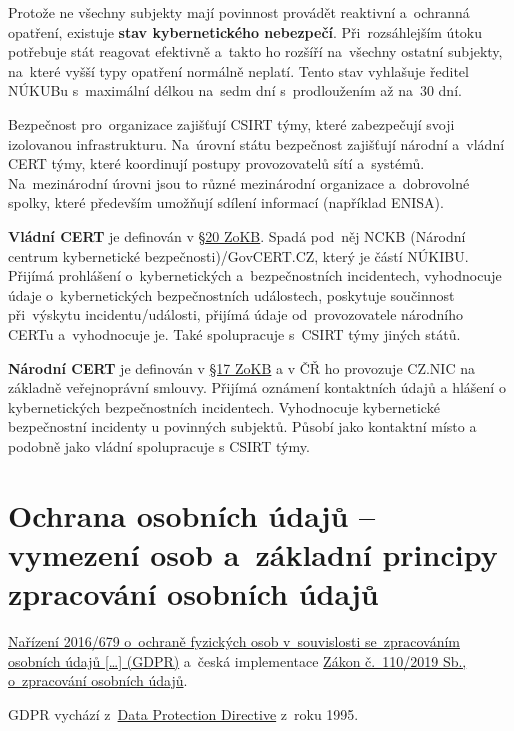Protože ne všechny subjekty mají povinnost provádět reaktivní a~ochranná opatření, existuje \textbf{stav kybernetického nebezpečí}. Při~rozsáhlejším útoku potřebuje stát reagovat efektivně a~takto ho rozšíří na~všechny ostatní subjekty, na~které vyšší typy opatření normálně neplatí. Tento stav vyhlašuje ředitel NÚKUBu s~maximální délkou na~sedm dní s~prodloužením až na~30 dní.

Bezpečnost pro~organizace zajišťují CSIRT týmy, které zabezpečují svoji izolovanou infrastrukturu. Na~úrovní státu bezpečnost zajišťují národní a~vládní CERT týmy, které koordinují postupy provozovatelů sítí a~systémů. Na~mezinárodní úrovni jsou to různé mezinárodní organizace a~dobrovolné spolky, které především umožňují sdílení informací (například ENISA).

\textbf{Vládní CERT} je definován v \href{https://www.zakonyprolidi.cz/cs/2014-181#p20}{§20 ZoKB}. Spadá pod~něj NCKB (Národní centrum kybernetické bezpečnosti)/GovCERT.CZ, který je částí NÚKIBU. Přijímá prohlášení o~kybernetických a~bezpečnostních incidentech, vyhodnocuje údaje o~kybernetických bezpečnostních událostech, poskytuje součinnost při~výskytu incidentu/události, přijímá údaje od~provozovatele národního CERTu a~vyhodnocuje je. Také spolupracuje s~CSIRT týmy jiných států.

\textbf{Národní CERT} je definován v \href{https://www.zakonyprolidi.cz/cs/2014-181#p17}{§17 ZoKB} a v ČŘ ho provozuje CZ.NIC na základně veřejnoprávní smlouvy. Přijímá oznámení kontaktních údajů a hlášení o kybernetických bezpečnostních incidentech. Vyhodnocuje kybernetické bezpečnostní incidenty u povinných subjektů. Působí jako kontaktní místo a podobně jako vládní spolupracuje s CSIRT týmy.







\clearpage
\section{Ochrana osobních údajů -- vymezení osob a~základní principy zpracování osobních údajů}

\href{https://eur-lex.europa.eu/legal-content/CS/TXT/HTML/?uri=CELEX:32016R0679}{Nařízení 2016/679 o~ochraně fyzických osob v~souvislosti se~zpracováním osobních údajů [\dots] (GDPR)} a~česká implementace
\href{https://www.zakonyprolidi.cz/cs/2019-110}{Zákon č.~110/2019 Sb., o~zpracování osobních údajů}.

GDPR vychází z~\href{https://eur-lex.europa.eu/legal-content/cs/TXT/HTML/?uri=CELEX:31995L0046}{Data Protection Directive} z~roku 1995.

